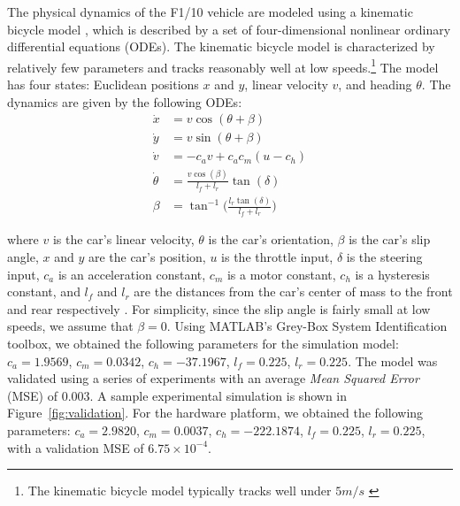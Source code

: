 \documentclass[manuscript,screen,review]{acmart}
\begin{document}
The physical dynamics of the F1/10 vehicle are modeled using a kinematic bicycle model \cite{Rajamani2012}, which is described by a set of four-dimensional nonlinear ordinary differential equations (ODEs). The kinematic bicycle model is characterized by relatively few parameters and tracks reasonably well at low speeds.\footnote{ The kinematic bicycle model typically tracks well under $5 m/s$ \cite{ivanov2020case}} The model has four states: Euclidean positions $x$ and $y$, linear velocity $v$, and heading $\theta$. The dynamics are given by the following ODEs: 
\begin{align*}
    \Dot{x} & = v\cos(\theta +\beta)\\
    \Dot{y} & = v\sin(\theta + \beta)\\
    \Dot{v} & = -c_av +c_ac_m(u-c_h)\\
    \Dot{\theta} & = \frac{v\cos(\beta)}{l_f+l_r}\tan(\delta)\\
    \beta &= \tan^{-1}\Big(\frac{l_r\tan(\delta)}{l_f+l_r}\Big)
\end{align*}




\noindent where $v$ is the car's linear velocity, $\theta$ is the car's orientation, $\beta$ is the car's slip angle, $x$ and $y$ are the car's position, $u$ is the throttle input, $\delta$ is the steering input, $c_a$ is an acceleration constant, $c_m$ is a motor constant, $c_h$ is a hysteresis constant, and $l_f$ and $l_r$ are the distances from the car's center of mass to the front and rear respectively \cite{ivanov2020case}. For simplicity, since the slip angle is fairly small at low speeds, we assume that $\beta = 0$.
Using MATLAB's Grey-Box System Identification toolbox, we obtained the following parameters for the simulation model: $c_a = 1.9569$, $c_m = 0.0342$, $c_h = -37.1967$, $l_f =0.225$, $l_r = 0.225$. The model was validated using a series of experiments %
with an average \emph{Mean Squared Error} (MSE) of $0.003$. A sample experimental simulation is shown in Figure~\ref{fig:validation}. For the hardware platform, we obtained the following parameters: $c_a = 2.9820$, $c_m = 0.0037$, $c_h = -222.1874$, $l_f =0.225$, $l_r = 0.225$, with a validation MSE of $6.75 \times 10^{-4}$.
\end{document}
